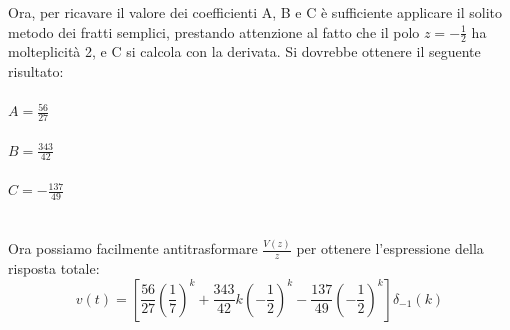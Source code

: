 \documentclass[12pt,a4paper]{article}
\begin{document}
\begin{enumerate}
		Ora, per ricavare il valore dei coefficienti A, B e C \`e sufficiente applicare il solito metodo dei fratti semplici, prestando attenzione al fatto che il polo $z = -\frac{1}{2}$ ha molteplicità 2, e C si calcola con la derivata.
		Si dovrebbe ottenere il seguente risultato:\\ \\
		$A = \frac{56}{27}$ \\ \\
		$B = \frac{343}{42}$ \\ \\
		$C = -\frac{137}{49}$ \\ \\ \\
		Ora possiamo facilmente antitrasformare $\frac{V(z)}{z}$ per ottenere l'espressione della risposta totale:
		\[
			v(t) = \left[ \frac{56}{27}\left(\frac{1}{7}\right)^k + \frac{343}{42}k\left(-\frac{1}{2}\right)^k - \frac{137}{49}\left(-\frac{1}{2}\right)^k\right]\delta_{-1}(k)
		\]
		\end{enumerate}
		\newpage
\end{document}
